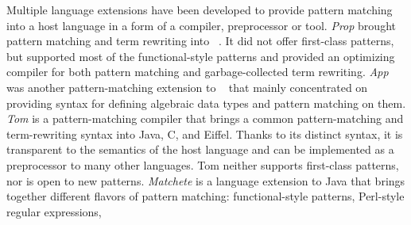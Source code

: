 Multiple language extensions have been developed to provide pattern matching into 
a host language in a form of a compiler, preprocessor or tool.
%
\emph{Prop} %
brought pattern matching and term 
rewriting into \Cpp{}~\cite{Prop96}. %
It did not offer 
first-class patterns, but supported most of the functional-style patterns and 
provided an optimizing compiler for both pattern matching and garbage-collected 
term rewriting. \emph{App} was another pattern-matching extension to \Cpp{}~\cite{App} 
that mainly concentrated on providing syntax for defining algebraic data types and pattern matching on them. 
%
\emph{Tom} is a pattern-matching compiler that %
brings a common 
pattern-matching and term-rewriting syntax into Java, C, and Eiffel. %
Thanks to its distinct syntax, it is transparent to the semantics of the host language 
and can be implemented as a preprocessor to many other languages. %
Tom neither supports first-class patterns, nor is open to new patterns. 
%
\emph{Matchete} is a language extension to Java that brings together different flavors 
of pattern matching: functional-style patterns, Perl-style regular expressions, 
